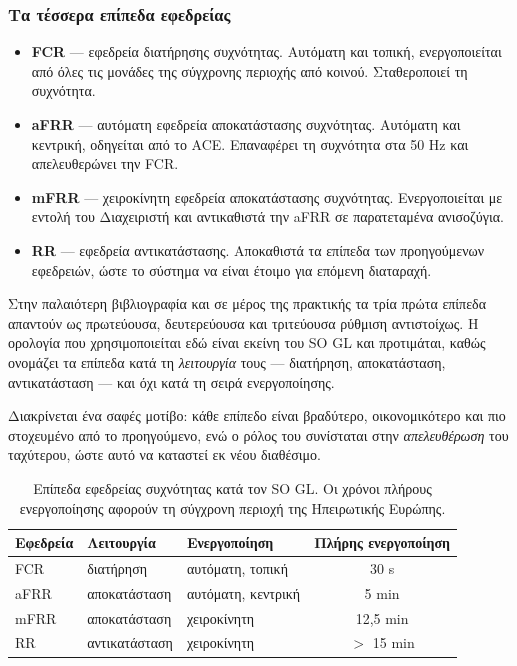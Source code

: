 \subsubsection*{Τα τέσσερα επίπεδα εφεδρείας}

\begin{itemize}
\item \textbf{FCR} --- εφεδρεία διατήρησης συχνότητας. Αυτόματη και τοπική, ενεργοποιείται
      από όλες τις μονάδες της σύγχρονης περιοχής από κοινού. Σταθεροποιεί τη συχνότητα.
\item \textbf{aFRR} --- αυτόματη εφεδρεία αποκατάστασης συχνότητας. Αυτόματη και κεντρική,
      οδηγείται από το ACE. Επαναφέρει τη συχνότητα στα 50 Hz και απελευθερώνει την FCR.
\item \textbf{mFRR} --- χειροκίνητη εφεδρεία αποκατάστασης συχνότητας. Ενεργοποιείται με
      εντολή του Διαχειριστή και αντικαθιστά την aFRR σε παρατεταμένα ανισοζύγια.
\item \textbf{RR} --- εφεδρεία αντικατάστασης. Αποκαθιστά τα επίπεδα των προηγούμενων
      εφεδρειών, ώστε το σύστημα να είναι έτοιμο για επόμενη διαταραχή.
\end{itemize}

Στην παλαιότερη βιβλιογραφία και σε μέρος της πρακτικής τα τρία πρώτα επίπεδα απαντούν ως
πρωτεύουσα, δευτερεύουσα και τριτεύουσα ρύθμιση αντιστοίχως. Η ορολογία που χρησιμοποιείται
εδώ είναι εκείνη του SO GL και προτιμάται, καθώς ονομάζει τα επίπεδα κατά τη \emph{λειτουργία}
τους — διατήρηση, αποκατάσταση, αντικατάσταση — και όχι κατά τη σειρά ενεργοποίησης.

Διακρίνεται ένα σαφές μοτίβο: κάθε επίπεδο είναι βραδύτερο, οικονομικότερο και πιο
στοχευμένο από το προηγούμενο, ενώ ο ρόλος του συνίσταται στην \emph{απελευθέρωση} του
ταχύτερου, ώστε αυτό να καταστεί εκ νέου διαθέσιμο.

\begin{table}[!htbp]
\centering
\begin{tabular}{lllc}
\hline
Εφεδρεία & Λειτουργία & Ενεργοποίηση & Πλήρης ενεργοποίηση \\
\hline
FCR  & διατήρηση      & αυτόματη, τοπική   & 30 s \\
aFRR & αποκατάσταση   & αυτόματη, κεντρική & 5 min \\
mFRR & αποκατάσταση   & χειροκίνητη        & 12,5 min \\
RR   & αντικατάσταση  & χειροκίνητη        & $>$ 15 min \\
\hline
\end{tabular}
\caption{Επίπεδα εφεδρείας συχνότητας κατά τον SO GL. Οι χρόνοι πλήρους ενεργοποίησης
αφορούν τη σύγχρονη περιοχή της Ηπειρωτικής Ευρώπης.}
\label{tab:reserves}
\end{table}

